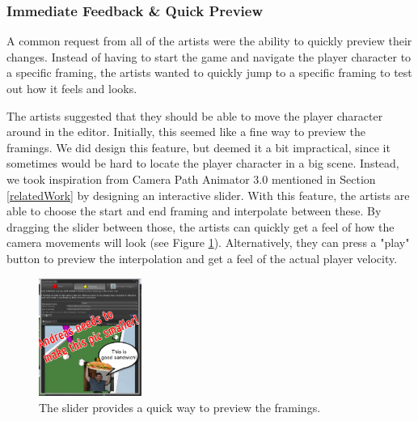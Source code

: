 
\subsubsection{Immediate Feedback \& Quick Preview}
A common request from all of the artists were the ability to quickly preview their changes. Instead of having to start the game and navigate the player character to a specific framing, the artists wanted to quickly jump to a specific framing to test out how it feels and looks.

The artists suggested that they should be able to move the player character around in the editor. Initially, this seemed like a fine way to preview the framings. We did design this feature, but deemed it a bit impractical, since it sometimes would be hard to locate the player character in a big scene. Instead, we took inspiration from Camera Path Animator 3.0 mentioned in Section \ref{relatedWork} by designing an interactive slider. With this feature, the artists are able to choose the start and end framing and interpolate between these. By dragging the slider between those, the artists can quickly get a feel of how the camera movements will look (see Figure \ref{fig:slider}). Alternatively, they can press a "play" button to preview the interpolation and get a feel of the actual player velocity.

\begin{figure}[htbp]
\centering
\includegraphics[width=0.3\textwidth]{Pics/slider}
\caption{The slider provides a quick way to preview the framings.}
\label{fig:slider}
\end{figure}